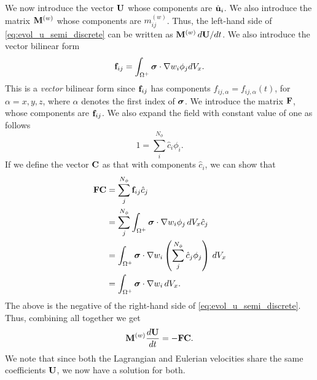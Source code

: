 \documentclass[11pt]{article}
\begin{document}
We now introduce the vector $\mathbf{U}$ whose components are $\hat{\mathbf{u}}_i$. We also introduce the matrix $\mathbf{M}^{(w)}$ whose components are $m_{ij}^{(w)}$. Thus, the left-hand side of \cref{eq:evol_u_semi_discrete} can be written as $\mathbf{M}^{(w)} \, d\mathbf{U} / dt$.
We also introduce the vector bilinear form
\begin{equation}
    \mathbf{f}_{ij} = \int_{\Omega^+} \bm \sigma \cdot \nabla w_i \phi_j dV_x.
\end{equation}
This is a \textit{vector} bilinear form since $\mathbf{f}_{ij}$ has components $f_{ij,\alpha} = f_{ij,\alpha}(t)$, for $\alpha = x,y,z$, where $\alpha$ denotes the first index of $\bm \sigma$. We introduce the matrix $\mathbf{F}$, whose components are $\mathbf{f}_{ij}$. We also expand the field with constant value of one as follows
\begin{equation}
    1 = \sum_i^{N_\phi} \hat{c}_i \phi_i.
\end{equation}
If we define the vector $\mathbf{C}$ as that with components $\hat{c}_i$, we can show that 
\begin{align}
    \mathbf{F} \mathbf{C} &= \sum_j^{N_\phi} \mathbf{f}_{ij} \hat{c}_j \nonumber \\
    &= \sum_j^{N_\phi} \int_{\Omega^+} \bm \sigma \cdot \nabla w_i \phi_j \, dV_x \hat{c}_j \nonumber \\
    &= \int_{\Omega^+} \bm \sigma \cdot \nabla w_i \left ( \sum_j^{N_\phi} \hat{c}_j \phi_j \right ) \, dV_x \nonumber \\
    &= \int_{\Omega^+} \bm \sigma \cdot \nabla w_i \, dV_x.
\end{align}
The above is the negative of the right-hand side of \cref{eq:evol_u_semi_discrete}. Thus, combining all together we get
\begin{equation}
    \mathbf{M}^{(w)} \frac{d\mathbf{U}}{dt} = -\mathbf{F} \mathbf{C}.
\end{equation}
We note that since both the Lagrangian and Eulerian velocities share the same coefficients $\mathbf{U}$, we now have a solution for both.

\end{document}
